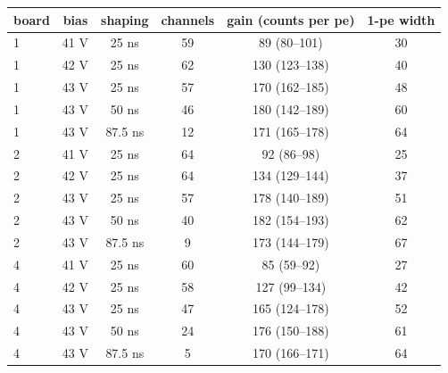 \begin{tabular}{lccccc}
\toprule
board & bias & shaping & channels & gain (counts per pe) & 1-pe width \\
\midrule
1 & 41 V & 25 ns & 59 & 89 (80--101) & 30 \\
1 & 42 V & 25 ns & 62 & 130 (123--138) & 40 \\
1 & 43 V & 25 ns & 57 & 170 (162--185) & 48 \\
1 & 43 V & 50 ns & 46 & 180 (142--189) & 60 \\
1 & 43 V & 87.5 ns & 12 & 171 (165--178) & 64 \\
\midrule
2 & 41 V & 25 ns & 64 & 92 (86--98) & 25 \\
2 & 42 V & 25 ns & 64 & 134 (129--144) & 37 \\
2 & 43 V & 25 ns & 57 & 178 (140--189) & 51 \\
2 & 43 V & 50 ns & 40 & 182 (154--193) & 62 \\
2 & 43 V & 87.5 ns & 9 & 173 (144--179) & 67 \\
\midrule
4 & 41 V & 25 ns & 60 & 85 (59--92) & 27 \\
4 & 42 V & 25 ns & 58 & 127 (99--134) & 42 \\
4 & 43 V & 25 ns & 47 & 165 (124--178) & 52 \\
4 & 43 V & 50 ns & 24 & 176 (150--188) & 61 \\
4 & 43 V & 87.5 ns & 5 & 170 (166--171) & 64 \\
\bottomrule
\end{tabular}
